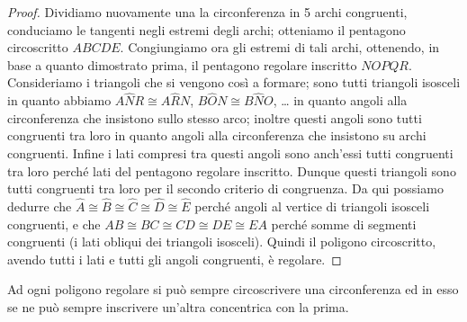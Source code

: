 \begin{figure}[!htb]
	\centering
\end{figure}

\begin{proof}
Dividiamo nuovamente una la circonferenza in 5 archi congruenti, conduciamo le tangenti negli estremi degli archi; otteniamo il pentagono circoscritto $ABCDE$.
Congiungiamo ora gli estremi di tali archi, ottenendo, in base a quanto dimostrato prima, il pentagono regolare inscritto $NOPQR$. Consideriamo i triangoli che si vengono così a formare; sono tutti triangoli isosceli in quanto abbiamo $A\widehat{N}R\cong A\widehat{R}N$, $B\widehat{O}N\cong B\widehat{N}O$, \ldots{} in quanto angoli alla circonferenza che insistono sullo stesso arco; inoltre questi angoli sono tutti congruenti tra loro in quanto angoli alla circonferenza che insistono su archi congruenti. Infine i lati compresi tra questi angoli sono anch'essi tutti congruenti tra loro perché lati del pentagono regolare inscritto. Dunque questi triangoli sono tutti congruenti tra loro per il secondo criterio di congruenza. Da qui possiamo dedurre che $\widehat{A}\cong \widehat{B}\cong \widehat{C}\cong \widehat{D}\cong \widehat{E}$ perché angoli al vertice di triangoli isosceli congruenti, e che $AB\cong BC\cong CD\cong DE\cong EA$ perché somme di segmenti congruenti (i lati obliqui dei triangoli isosceli). Quindi il poligono circoscritto, avendo tutti i lati e tutti gli angoli congruenti, è regolare.
\end{proof}

\begin{teorema}\label{teo:poly_reg_circ_inscr_circos}
Ad ogni poligono regolare si può sempre circoscrivere una circonferenza ed in esso se ne può sempre inscrivere un'altra concentrica con la prima.
\end{teorema}

\begin{figure}[!htb]
	\centering
\end{figure}


